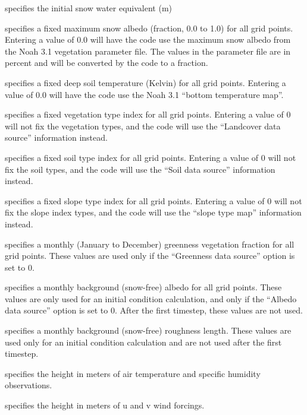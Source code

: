   specifies the initial snow 
 water equivalent (m)

  specifies a fixed maximum snow
 albedo (fraction, 0.0 to 1.0) for all grid points.  Entering a value
 of 0.0 will have the code use the maximum snow albedo from the Noah
 3.1 vegetation parameter file.  The values in the parameter file are
 in percent and will be converted by the code to a fraction.

  specifies a fixed deep soil
 temperature (Kelvin) for all grid points.  Entering a value of 0.0
 will have the code use the Noah 3.1 ``bottom temperature map''.

  specifies a fixed vegetation type
 index for all grid points.  Entering a value of 0 will not fix the
 vegetation types, and the code will use the ``Landcover data source''
 information instead.

  specifies a fixed soil type index for
 all grid points.  Entering a value of 0 will not fix the soil types,
 and the code will use the ``Soil data source'' information instead.

  specifies a fixed slope type index
 for all grid points.  Entering a value of 0 will not fix the slope
 index types, and the code will use the ``slope type map'' information
 instead.

  specifies a monthly (January
 to December) greenness vegetation fraction for all grid points.
 These values are used only if the ``Greenness data source'' option
 is set to 0.

  specifies a monthly background
 (snow-free) albedo for all grid points.  These values are only
 used for an initial condition calculation, and only if the
 ``Albedo data source'' option is set to 0.  After the first
 timestep, these values are not used.

  specifies a monthly
 background (snow-free) roughness length.  These values are used
 only for an initial condition calculation and are not used after
 the first timestep.

  specifies the
 height in meters of air temperature and specific humidity observations.

  specifies the
 height in meters of u and v wind forcings.
 

